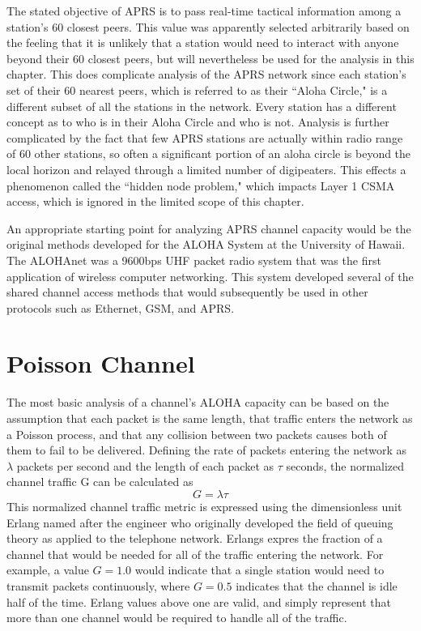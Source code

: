 The stated objective of APRS is to
pass real-time tactical information among a station's 60 closest peers.
This value was apparently selected arbitrarily based on the feeling that
it is unlikely that a station would need to interact with anyone beyond their 60
closest peers, but will nevertheless be used for the analysis in this chapter.
This does complicate analysis of the APRS network since each station's set of
their 60 nearest peers, which is referred to as their ``Aloha Circle,"
is a different subset of all the stations in the network.
Every station has a different concept as to who is in their Aloha Circle and who
is not.
Analysis is further complicated by
the fact that few APRS stations are actually within radio range of 60 other stations,
so often a significant portion of an aloha circle is
beyond the local horizon and relayed through a limited number of digipeaters.
This effects a phenomenon called the ``hidden node problem," which impacts
Layer 1 CSMA access,
which is ignored in the limited scope of this chapter.

An appropriate starting point for analyzing APRS channel capacity would be the original methods
developed for the ALOHA System at the University of Hawaii\cite{packetthroughput}.
The ALOHAnet was a 9600bps UHF packet radio system that was the first application of 
wireless computer networking.
This system developed several of the shared channel access methods 
that would subsequently be used in other protocols such as Ethernet, GSM, and APRS.

\section{Poisson Channel}

The most basic analysis of a channel's ALOHA capacity can be based on the assumption that
each packet is the same length, 
that traffic enters the network as a Poisson process,
and that any collision between two packets causes both of them to fail to be delivered.
Defining the rate of packets entering the network as $\lambda$ packets per second and
the length of each packet as $\tau$ seconds,
the normalized channel traffic G can be
calculated as
\begin{equation}
	G = \lambda \tau
\end{equation}
This normalized channel traffic metric is expressed
using the dimensionless unit Erlang named after the engineer who originally
developed the field of queuing theory as applied to the telephone network.
Erlangs expres the fraction of a channel that would be needed for all
of the traffic entering the network.
For example, a value $G=1.0$ would indicate that
a single station would need to transmit packets continuously,
where $G=0.5$ indicates that the channel is idle half of the time.
Erlang values above one are valid, and simply represent that more than one
channel would be required to handle all of the traffic.

